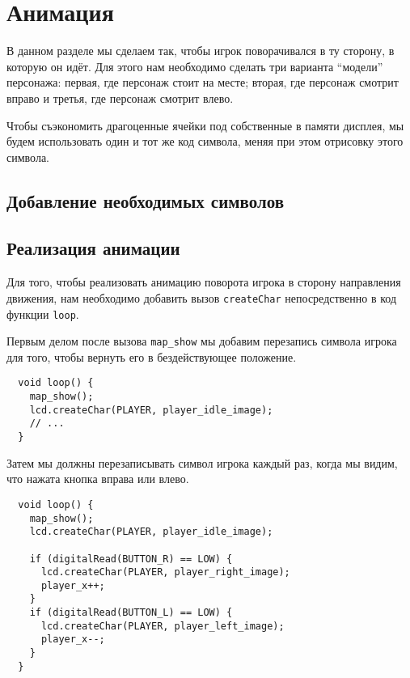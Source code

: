 \documentclass[../sparc.tex]{subfiles}
\begin{document}
\section{Анимация}

В данном разделе мы сделаем так, чтобы игрок поворачивался в ту сторону, в
которую он идёт.  Для этого нам необходимо сделать три варианта ``модели''
персонажа: первая, где персонаж стоит на месте; вторая, где персонаж смотрит
вправо и третья, где персонаж смотрит влево.

Чтобы съэкономить драгоценные ячейки под собственные в памяти дисплея, мы будем
использовать один и тот же код символа, меняя при этом отрисовку этого символа.

\subsection{Добавление необходимых символов}



\subsection{Реализация анимации}

Для того, чтобы реализовать анимацию поворота игрока в сторону направления
движения, нам необходимо добавить вызов \texttt{createChar} непосредственно в
код функции \texttt{loop}.

Первым делом после вызова \texttt{map_show} мы добавим перезапись символа игрока
для того, чтобы вернуть его в бездействующее положение.

\begin{verbatim}
  void loop() {
    map_show();
    lcd.createChar(PLAYER, player_idle_image);
    // ...
  }
\end{verbatim}

Затем мы должны перезаписывать символ игрока каждый раз, когда мы видим, что
нажата кнопка вправа или влево.

\begin{verbatim}
  void loop() {
    map_show();
    lcd.createChar(PLAYER, player_idle_image);

    if (digitalRead(BUTTON_R) == LOW) {
      lcd.createChar(PLAYER, player_right_image);
      player_x++;
    }
    if (digitalRead(BUTTON_L) == LOW) {
      lcd.createChar(PLAYER, player_left_image);
      player_x--;
    }
  }
\end{verbatim}
\end{document}
